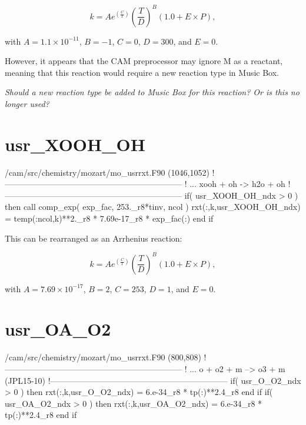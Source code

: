 \documentclass[titlepage]{article}
\begin{document}
\begin{equation}
k = Ae^{(\frac{C}{T})}(\frac{T}{D})^B(1.0+E \times P),
\end{equation}

\noindent with $A = 1.1 \times 10^{-11}$, $B = -1$, $C = 0$, $D = 300$, and $E = 0$.

However, it appears that the CAM preprocessor may ignore M as a reactant, meaning that
this reaction would require a new reaction type in Music Box.

\vspace{20px}
\textit{\Large Should a new reaction type be added to Music Box for this reaction? Or is
this no longer used?}


\section{usr\_XOOH\_OH}

\begin{blockcode}[commandchars=\\\{\}]
\color{gray}/cam/src/chemistry/mozart/mo_usrrxt.F90 (1046,1052)
!-----------------------------------------------------------------
!       ... xooh + oh -> h2o + oh
!-----------------------------------------------------------------
       if( usr_XOOH_OH_ndx > 0 ) then
          call comp_exp( exp_fac, 253._r8*tinv, ncol )
          rxt(:,k,usr_XOOH_OH_ndx) = temp(:ncol,k)**2._r8 * 7.69e-17_r8 * exp_fac(:)
       end if
\end{blockcode}

This can be rearranged as an Arrhenius reaction:

\begin{equation}
k = Ae^{(\frac{C}{T})}(\frac{T}{D})^B(1.0+E \times P),
\end{equation}

\noindent with $A = 7.69 \times 10^{-17}$, $B = 2$, $C = 253$, $D = 1$, and $E = 0$.



\section{usr\_OA\_O2}

\begin{blockcode}[commandchars=\\\{\}]
\color{gray}/cam/src/chemistry/mozart/mo_usrrxt.F90 (800,808)
!-----------------------------------------------------------------
! ... o + o2 + m --> o3 + m (JPL15-10)
!-----------------------------------------------------------------
       if( usr_O_O2_ndx > 0 ) then
          rxt(:,k,usr_O_O2_ndx) = 6.e-34_r8 * tp(:)**2.4_r8
       end if
       if( usr_OA_O2_ndx > 0 ) then
          rxt(:,k,usr_OA_O2_ndx) = 6.e-34_r8 * tp(:)**2.4_r8
       end if
\end{blockcode}
\end{document}
